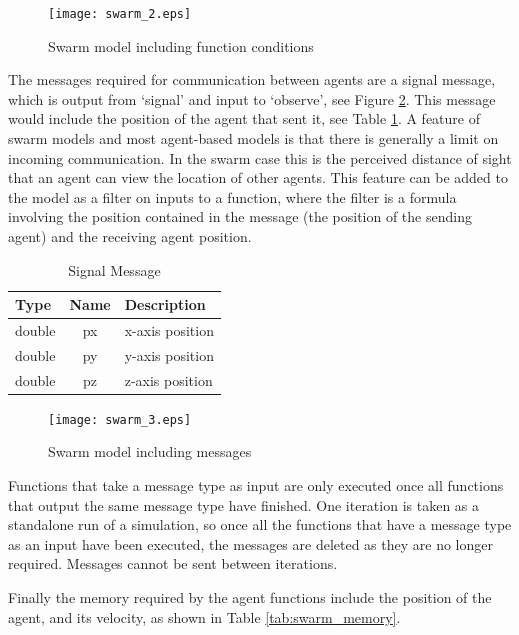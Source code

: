 \begin{figure}[ht]
\begin{center}
\texttt{[image: swarm\_2.eps]}
\caption{Swarm model including function conditions}
\label{fig:swarm_2}
\end{center}
\end{figure}

The messages required for communication between agents are a signal message,
which is output from `signal' and input to `observe', see Figure
\ref{fig:swarm_3}. This message would include the position of the agent that
sent it, see Table \ref{tab:signal_message}. A feature of swarm models and most
agent-based models is that there is generally a limit on incoming communication. 
In the swarm case this is the perceived distance of sight that an agent can view the location of other
agents. This feature can be added to the model as a filter on inputs to a
function, where the filter is a formula involving the position contained in the
message (the position of the sending agent) and the receiving agent position.

\begin{table}[ht]
\centering
\begin{tabular}{|l||c||l|}
\hline
Type&Name&Description\\
\hline \hline
double&px&x-axis position\\
\hline
double&py&y-axis position\\
\hline
double&pz&z-axis position\\
\hline
\end{tabular}
\caption{Signal Message}
\label{tab:signal_message}
\end{table}

\begin{figure}[ht]
\begin{center}
\texttt{[image: swarm\_3.eps]}
\caption{Swarm model including messages}
\label{fig:swarm_3}
\end{center}
\end{figure}

Functions that take a message type as input are only executed once all functions
that output the same message type have finished. One iteration is taken as a
standalone run of a simulation, so once all the functions that have a message
type as an input have been executed, the messages are deleted as they are no
longer required. Messages cannot be sent between iterations.

Finally the memory required by the agent functions include the position of the
agent, and its velocity, as shown in Table \ref{tab:swarm_memory}.

